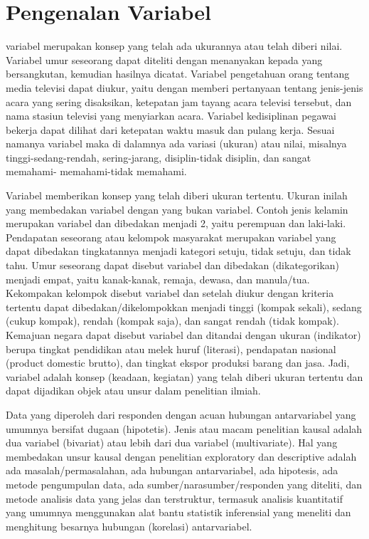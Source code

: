 

\section{Pengenalan Variabel}
variabel merupakan konsep yang telah ada ukurannya atau telah diberi nilai. Variabel umur seseorang dapat diteliti dengan 
menanyakan kepada yang bersangkutan, kemudian hasilnya dicatat. Variabel pengetahuan orang tentang media televisi dapat diukur,  yaitu dengan memberi pertanyaan tentang jenis-jenis acara yang sering disaksikan, ketepatan jam tayang acara televisi tersebut, 
dan nama stasiun televisi yang menyiarkan acara. Variabel kedisiplinan pegawai bekerja dapat dilihat dari ketepatan waktu masuk  dan pulang kerja. Sesuai namanya variabel maka di dalamnya ada variasi (ukuran) atau nilai, misalnya tinggi-sedang-rendah, 
sering-jarang, disiplin-tidak disiplin, dan sangat memahami- memahami-tidak memahami.

Variabel memberikan konsep yang telah diberi ukuran tertentu. Ukuran inilah yang membedakan variabel dengan yang bukan variabel. 
Contoh jenis kelamin merupakan variabel dan dibedakan menjadi 2, yaitu perempuan dan laki-laki. Pendapatan seseorang atau 
kelompok masyarakat merupakan variabel yang dapat dibedakan tingkatannya menjadi kategori setuju, tidak setuju, dan tidak tahu. 
Umur seseorang dapat disebut variabel dan dibedakan (dikategorikan) menjadi empat, yaitu kanak-kanak, remaja, dewasa, dan 
manula/tua. Kekompakan kelompok disebut variabel dan setelah diukur dengan kriteria tertentu dapat dibedakan/dikelompokkan 
menjadi tinggi (kompak sekali), sedang (cukup kompak), rendah (kompak saja), dan sangat rendah (tidak kompak). Kemajuan negara 
dapat disebut variabel dan ditandai dengan ukuran (indikator) berupa tingkat pendidikan atau melek huruf (literasi), pendapatan 
nasional (product domestic brutto), dan tingkat ekspor produksi barang dan jasa. Jadi, variabel adalah konsep (keadaan, 
kegiatan) yang telah diberi ukuran tertentu dan dapat dijadikan objek atau unsur dalam penelitian ilmiah.

Data yang diperoleh dari responden dengan acuan hubungan antarvariabel yang umumnya bersifat dugaan (hipotetis). Jenis atau 
macam penelitian kausal adalah dua variabel (bivariat) atau lebih dari dua variabel (multivariate). Hal yang membedakan unsur 
kausal dengan penelitian exploratory dan descriptive adalah ada masalah/permasalahan, ada hubungan antarvariabel, ada hipotesis, 
ada metode pengumpulan data, ada sumber/narasumber/responden yang diteliti, dan metode analisis data yang jelas dan terstruktur, 
termasuk analisis kuantitatif yang umumnya menggunakan alat bantu statistik inferensial yang meneliti dan menghitung besarnya 
hubungan (korelasi) antarvariabel.

